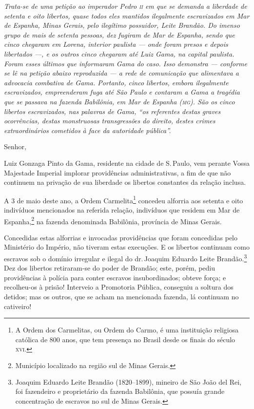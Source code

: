 \begin{resumo}
\emph{Trata-se de uma petição ao imperador Pedro \textsc{ii} em que se demanda a
liberdade de setenta e oito libertos, quase todos eles mantidos
ilegalmente escravizados em Mar de Espanha, Minas Gerais, pelo ilegítimo
possuidor, Leite Brandão. Do imenso grupo de mais de setenta pessoas,
dez fugiram de Mar de Espanha, sendo que cinco chegaram em Lorena,
interior paulista --- onde foram presos e depois libertados ---, e os
outros cinco chegaram até Luiz Gama, na capital paulista. Foram esses
últimos que informaram Gama do caso. Isso demonstra --- conforme se lê na
petição abaixo reproduzida --- a rede de comunicação que alimentava a
advocacia combativa de Gama. Portanto, cinco libertos, embora
ilegalmente escravizados, empreenderam fuga até São Paulo e contaram a
Gama a tragédia que se passava na fazenda Babilônia, em Mar de Espanha
(\textsc{mg}). São os cinco libertos
escravizados, nas palavras de Gama, ``os referentes destas graves ocorrências, destas
monstruosas transgressões do direito, destes crimes extraordinários
cometidos à face da autoridade pública''. }
\end{resumo}\pagebreak

Senhor,

Luiz Gonzaga Pinto da Gama, residente na cidade de S.\,Paulo, vem perante
Vossa Majestade Imperial implorar providências administrativas, a fim de
que não continuem na privação de sua liberdade os libertos constantes da
relação inclusa.

A 3 de maio deste ano, a Ordem Carmelita\footnote{A Ordem dos
  Carmelitas, ou Ordem do Carmo, é uma instituição religiosa católica de
  800 anos, que tem presença no Brasil desde os finais do século \textsc{xvi}.}
concedeu alforria aos setenta e oito indivíduos mencionados na referida
relação, indivíduos que residem em Mar de Espanha,\footnote{Município
  localizado na região sul de Minas Gerais.} na fazenda denominada
Babilônia, província de Minas Gerais.

Concedidas estas alforrias e invocadas providências que foram concedidas
pelo Ministério do Império, não tiveram estas execuções. E os libertos
continuam como escravos sob o domínio irregular e ilegal do dr.\,Joaquim
Eduardo Leite Brandão.\footnote{Joaquim Eduardo Leite Brandão
  (1820--1899), mineiro de São João del Rei, foi fazendeiro e
  proprietário da fazenda Babilônia, que possuía grande concentração de
  escravos no sul de Minas Gerais.} Dez dos libertos retiraram-se do
poder de Brandão; este, porém, pediu providências à polícia para conter
escravos insubordinados; obteve força; e recolheu-os à prisão! Interveio
a Promotoria Pública, conseguiu a soltura dos detidos; mas os outros,
que se acham na mencionada fazenda, lá continuam no cativeiro!

